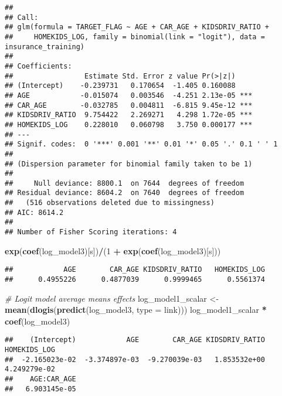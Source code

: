 \documentclass[
]{article}
\newenvironment{Shaded}{\begin{snugshade}}{\end{snugshade}}
\newcommand{\AttributeTok}[1]{\textcolor[rgb]{0.13,0.29,0.53}{#1}}
\newcommand{\CommentTok}[1]{\textcolor[rgb]{0.56,0.35,0.01}{\textit{#1}}}
\newcommand{\DecValTok}[1]{\textcolor[rgb]{0.00,0.00,0.81}{#1}}
\newcommand{\FunctionTok}[1]{\textcolor[rgb]{0.13,0.29,0.53}{\textbf{#1}}}
\newcommand{\NormalTok}[1]{#1}
\newcommand{\OtherTok}[1]{\textcolor[rgb]{0.56,0.35,0.01}{#1}}
\newcommand{\SpecialCharTok}[1]{\textcolor[rgb]{0.81,0.36,0.00}{\textbf{#1}}}
\newcommand{\StringTok}[1]{\textcolor[rgb]{0.31,0.60,0.02}{#1}}
\begin{document}
\begin{verbatim}
## 
## Call:
## glm(formula = TARGET_FLAG ~ AGE + CAR_AGE + KIDSDRIV_RATIO + 
##     HOMEKIDS_LOG, family = binomial(link = "logit"), data = insurance_training)
## 
## Coefficients:
##                 Estimate Std. Error z value Pr(>|z|)    
## (Intercept)    -0.239731   0.170654  -1.405 0.160088    
## AGE            -0.015074   0.003546  -4.251 2.13e-05 ***
## CAR_AGE        -0.032785   0.004811  -6.815 9.45e-12 ***
## KIDSDRIV_RATIO  9.754422   2.269271   4.298 1.72e-05 ***
## HOMEKIDS_LOG    0.228010   0.060798   3.750 0.000177 ***
## ---
## Signif. codes:  0 '***' 0.001 '**' 0.01 '*' 0.05 '.' 0.1 ' ' 1
## 
## (Dispersion parameter for binomial family taken to be 1)
## 
##     Null deviance: 8800.1  on 7644  degrees of freedom
## Residual deviance: 8604.2  on 7640  degrees of freedom
##   (516 observations deleted due to missingness)
## AIC: 8614.2
## 
## Number of Fisher Scoring iterations: 4
\end{verbatim}

\begin{Shaded}
\begin{Highlighting}[]
\FunctionTok{exp}\NormalTok{(}\FunctionTok{coef}\NormalTok{(log\_model3)[s])}\SpecialCharTok{/}\NormalTok{(}\DecValTok{1} \SpecialCharTok{+} \FunctionTok{exp}\NormalTok{(}\FunctionTok{coef}\NormalTok{(log\_model3)[s]))}
\end{Highlighting}
\end{Shaded}

\begin{verbatim}
##            AGE        CAR_AGE KIDSDRIV_RATIO   HOMEKIDS_LOG 
##      0.4955226      0.4877039      0.9999465      0.5561374
\end{verbatim}

\begin{Shaded}
\begin{Highlighting}[]
\CommentTok{\# Logit model average means  effects }
\NormalTok{log\_model1\_scalar  }\OtherTok{\textless{}{-}} \FunctionTok{mean}\NormalTok{(}\FunctionTok{dlogis}\NormalTok{(}\FunctionTok{predict}\NormalTok{(log\_model3, }\AttributeTok{type =} \StringTok{\textquotesingle{}link\textquotesingle{}}\NormalTok{)))}
\NormalTok{log\_model1\_scalar }\SpecialCharTok{*} \FunctionTok{coef}\NormalTok{(log\_model3)}
\end{Highlighting}
\end{Shaded}

\begin{verbatim}
##    (Intercept)            AGE        CAR_AGE KIDSDRIV_RATIO   HOMEKIDS_LOG 
##  -2.165023e-02  -3.374897e-03  -9.270039e-03   1.853532e+00   4.249279e-02 
##    AGE:CAR_AGE 
##   6.903145e-05
\end{verbatim}
\end{document}
